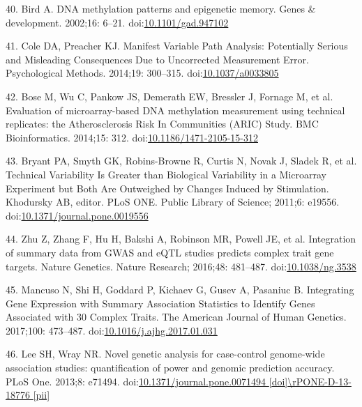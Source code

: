 \documentclass[]{article}
\begin{document}
\leavevmode\hypertarget{ref-Bird2002}{}%
40. Bird A. DNA methylation patterns and epigenetic memory. Genes \&
development. 2002;16: 6--21.
doi:\href{https://doi.org/10.1101/gad.947102}{10.1101/gad.947102}

\leavevmode\hypertarget{ref-Cole2014}{}%
41. Cole DA, Preacher KJ. Manifest Variable Path Analysis: Potentially
Serious and Misleading Consequences Due to Uncorrected Measurement
Error. Psychological Methods. 2014;19: 300--315.
doi:\href{https://doi.org/10.1037/a0033805}{10.1037/a0033805}

\leavevmode\hypertarget{ref-Bose2014}{}%
42. Bose M, Wu C, Pankow JS, Demerath EW, Bressler J, Fornage M, et al.
Evaluation of microarray-based DNA methylation measurement using
technical replicates: the Atherosclerosis Risk In Communities (ARIC)
Study. BMC Bioinformatics. 2014;15: 312.
doi:\href{https://doi.org/10.1186/1471-2105-15-312}{10.1186/1471-2105-15-312}

\leavevmode\hypertarget{ref-Bryant2011}{}%
43. Bryant PA, Smyth GK, Robins-Browne R, Curtis N, Novak J, Sladek R,
et al. Technical Variability Is Greater than Biological Variability in a
Microarray Experiment but Both Are Outweighed by Changes Induced by
Stimulation. Khodursky AB, editor. PLoS ONE. Public Library of Science;
2011;6: e19556.
doi:\href{https://doi.org/10.1371/journal.pone.0019556}{10.1371/journal.pone.0019556}

\leavevmode\hypertarget{ref-Zhu2016}{}%
44. Zhu Z, Zhang F, Hu H, Bakshi A, Robinson MR, Powell JE, et al.
Integration of summary data from GWAS and eQTL studies predicts complex
trait gene targets. Nature Genetics. Nature Research; 2016;48: 481--487.
doi:\href{https://doi.org/10.1038/ng.3538}{10.1038/ng.3538}

\leavevmode\hypertarget{ref-Mancuso2017}{}%
45. Mancuso N, Shi H, Goddard P, Kichaev G, Gusev A, Pasaniuc B.
Integrating Gene Expression with Summary Association Statistics to
Identify Genes Associated with 30 Complex Traits. The American Journal
of Human Genetics. 2017;100: 473--487.
doi:\href{https://doi.org/10.1016/j.ajhg.2017.01.031}{10.1016/j.ajhg.2017.01.031}

\leavevmode\hypertarget{ref-Lee2013c}{}%
46. Lee SH, Wray NR. Novel genetic analysis for case-control genome-wide
association studies: quantification of power and genomic prediction
accuracy. PLoS One. 2013;8: e71494.
doi:\href{https://doi.org/10.1371/journal.pone.0071494\%20\%5Bdoi\%5D/rPONE-D-13-18776\%20\%5Bpii\%5D}{10.1371/journal.pone.0071494 {[}doi{]}\textbackslash{}rPONE-D-13-18776 {[}pii{]}}
\end{document}
